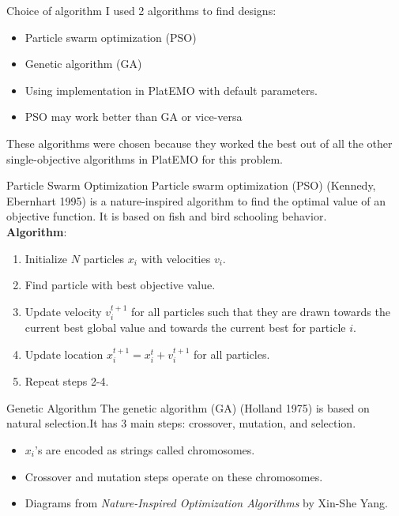 \documentclass[11pt]{beamer}
\begin{document}
\begin{frame}{Choice of algorithm}
I used 2 algorithms to find designs:
\begin{itemize}
\item Particle swarm optimization (PSO)
\item Genetic algorithm (GA)
\item Using implementation in PlatEMO with default parameters.
\item PSO may work better than GA or vice-versa
\end{itemize}
These algorithms were chosen because they worked the best out of all the other single-objective algorithms in PlatEMO for this problem.
\end{frame}

\begin{frame}{Particle Swarm Optimization}
Particle swarm optimization (PSO) (Kennedy, Ebernhart 1995) is a nature-inspired algorithm to find the optimal value of an objective function. It is based on fish and bird schooling behavior.\\
\textbf{Algorithm}:
\begin{enumerate}
\item Initialize $N$ particles $x_i$ with velocities $v_i$.
\item Find particle with best objective value.
\item Update velocity $v_i^{t+1}$ for all particles such that they are drawn towards the current best global value and towards the current best for particle $i$.
\item Update location $x_i^{t+1} = x_i^{t} + v_i^{t+1}$ for all particles.
\item Repeat steps 2-4.
\end{enumerate}
\end{frame}

\begin{frame}{Genetic Algorithm}
The genetic algorithm (GA) (Holland 1975) is based on natural selection.It has 3 main steps: crossover, mutation, and selection.
\begin{itemize}
\item $x_i$'s are encoded as strings called chromosomes.
\item Crossover and mutation steps operate on these chromosomes.
\item Diagrams from \textit{Nature-Inspired Optimization Algorithms} by Xin-She Yang.
\end{itemize}
\end{frame}
\end{document}
